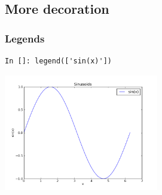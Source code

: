 \documentclass[14pt,compress]{beamer}
\newcommand{\emphbar}[1]
{\begin{beamercolorbox}[rounded=true]{emphbar} 
      {#1}
 \end{beamercolorbox}
}
\begin{document}

\subsection{More decoration}
\begin{frame}[fragile]
\frametitle{ Legends}
\vspace*{-0.15in}
\begin{lstlisting}
In []: legend(['sin(x)'])
\end{lstlisting}
  \vspace*{-0.1in}
  \begin{center}
  \includegraphics[height=2in, interpolate=true]{data/legend}  
  \end{center}
\end{frame}
\end{document}
